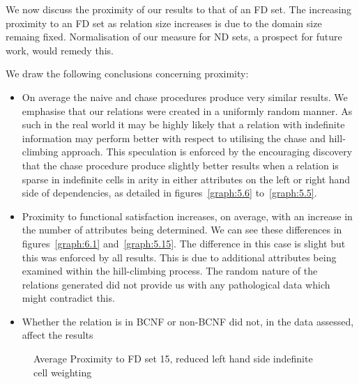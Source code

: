 We now discuss the proximity of our results to that of an FD set. The
increasing proximity to an FD set as relation size increases is due to
the domain size remaing fixed. Normalisation of our measure for ND
sets, a prospect for future work, would remedy this.

\medskip

We draw the following conclusions concerning proximity:
\begin{itemize}
\item On average the naive and chase procedures produce very similar
results. We emphasise that our relations were created in a uniformly
random manner. As such in the real world it may be highly likely that
a relation with indefinite information may perform better with respect
to utilising the chase and hill-climbing approach. This speculation is
enforced by the encouraging discovery that the chase procedure produce
slightly better results when a relation is sparse in indefinite cells
in arity in either attributes on the left or right hand side of
dependencies, as detailed in figures~\ref{graph:5.6}
to~\ref{graph:5.5}. 
\item Proximity to functional satisfaction increases, on average, with
an increase in the number of attributes being determined. We can see
these differences in figures~\ref{graph:6.1} and~\ref{graph:5.15}. The
difference in this case is slight but this was enforced by all
results. This is due to additional attributes being examined within
the hill-climbing process. The random nature of the relations
generated did not provide us with any pathological data
which might contradict this.
\item Whether the relation is in BCNF or non-BCNF did not, in the
data assessed, affect the results
\end{itemize}


\begin{figure}
\begin{minipage}{7cm}
\centerline{}
\caption{\label{graph:5.6} {Average Proximity to FD set 15, reduced
right hand side indefinite cell weighting}}
\end{minipage}
\hfill
\begin{minipage}{7cm}
\centerline{}
\caption{\label{graph:5.7} {Average Proximity to FD set 15, reduced
left hand side indefinite cell weighting}}
\end{minipage}
\end{figure}



